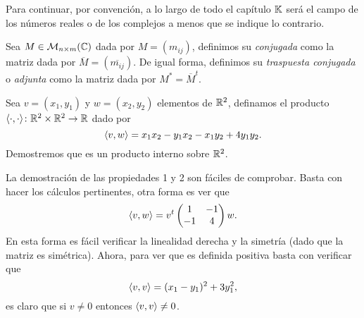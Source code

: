 Para continuar, por convención, a lo largo de todo el capítulo $\mathbb{K}$ será el campo de los números reales o de los complejos a menos que se indique lo contrario.

\begin{defi}
  Sea $M \in \mathcal{M}_{n\times m}(\mathbb{C})$ dada por $M = (m_{ij})$, definimos su \emph{conjugada} como la matriz dada por $\overline{M} = (\overline{m_{ij}})$. De igual forma, definimos su \emph{traspuesta conjugada} o \emph{adjunta} como la matriz dada por $M^* = \overline{M}^t$.
\end{defi}

\begin{example}
  Sea $v = (x_1, y_1)$ y $w = (x_2, y_2)$ elementos de $\mathbb{R}^2$, definamos el producto $\langle\cdot,\cdot\rangle\colon \mathbb{R}^2 \times \mathbb{R}^2 \to \mathbb{R}$ dado por
    \[ \langle v,w\rangle = x_1 x_2 - y_1x_2 - x_1y_2 + 4y_1y_2. \]
  Demostremos que es un producto interno sobre $\mathbb{R}^2$.

  \examplesolution

  La demostración de las propiedades 1 y 2 son fáciles de comprobar. Basta con hacer los cálculos pertinentes, otra forma es ver que 
    \[
      \langle v,w\rangle = v^t \begin{pmatrix}
        1 & -1 \\ -1 & 4
      \end{pmatrix} w.
    \]
  En esta forma es fácil verificar la linealidad derecha y la simetría (dado que la matriz es simétrica). Ahora, para ver que es definida positiva basta con verificar que
   \[
     \langle v,v\rangle = (x_1 - y_1)^2 + 3 y_1^2,
   \]
   es claro que si $v \neq 0$ entonces $\langle v,v\rangle \neq 0$.
\end{example}